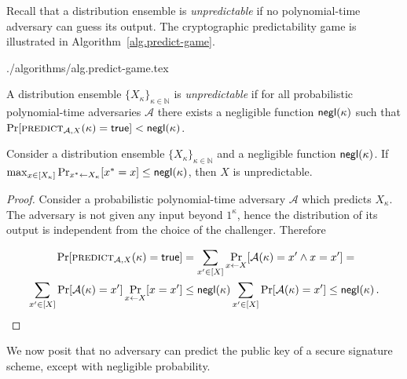 Recall that a distribution ensemble is \emph{unpredictable} if no
polynomial-time adversary can guess its output. The cryptographic
predictability game is illustrated in Algorithm~\ref{alg.predict-game}.

{./algorithms/alg.predict-game.tex}

\begin{definition}
  A distribution ensemble $\{X_{\kappa}\}_{\kappa\in\mathbb{N}}$ is
  \emph{unpredictable} if for all probabilistic polynomial-time adversaries
  $\mathcal{A}$ there exists a negligible function $\textsf{negl}(\kappa)$ such that
  $\Pr[\textsc{predict}_{\mathcal{A},X}(\kappa) = \mathsf{true}] < \textsf{negl}(\kappa)$.
\end{definition}

\begin{lemma}\label{lem:negl-unpred}
  Consider a distribution ensemble $\{X_{\kappa}\}_{\kappa\in\mathbb{N}}$ and
  a negligible function $\textsf{negl}(\kappa)$. If
  $\max_{x \in [X_\kappa]}\Pr_{x^* \gets X_\kappa}[x^* = x] \leq \textsf{negl}(\kappa)$,
  then $X$ is unpredictable.
\end{lemma}
\begin{proof}
  Consider a probabilistic polynomial-time adversary $\mathcal{A}$ which
  predicts $X_\kappa$. The adversary is not given any input beyond $1^\kappa$,
  hence the distribution of its output is independent from the choice of the
  challenger. Therefore

  \begin{align*}
  \Pr[\textsc{predict}_{\mathcal{A},X}(\kappa) = \mathsf{true}] &=
  \sum_{x' \in [X]}\Pr_{x \gets X}[\mathcal{A}(\kappa) = x'\land x = x'] =\\
  \sum_{x' \in [X]}\Pr[\mathcal{A}(\kappa) = x']\Pr_{x \gets X}[x = x']
  &\leq \textsf{negl}(\kappa)\sum_{x' \in [X]}\Pr[\mathcal{A}(\kappa) = x']
  \leq \textsf{negl}(\kappa)
  \,.
  \end{align*}
\end{proof}

We now posit that no adversary can predict the public key of a secure signature scheme, except with negligible probability.

